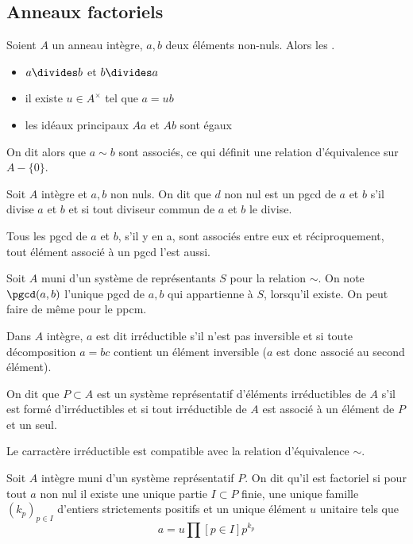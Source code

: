 \documentclass[a4paper,11pt,twocolumn]{article}
\begin{document}

  \subsection{Anneaux factoriels}

     Soient $A$ un anneau intègre, $a,b$ deux éléments non-nuls. Alors les \Asse{}.
    \begin{itemize}
      \item $a\divides b$ et $b\divides a$
      \item il existe $u\in A^\times$ tel que $a=ub$
      \item les idéaux principaux $Aa$ et $Ab$ sont égaux
    \end{itemize}

    On dit alors que $a\sim b$ sont associés, ce qui définit une relation d'équivalence sur $A-\{0\}$.

     Soit $A$ intègre et $a,b$ non nuls. On dit que $d$ non nul est un pgcd de $a$ et $b$ s'il divise $a$ et $b$ et si tout diviseur commun de $a$ et $b$ le divise.

     Tous les pgcd de $a$ et $b$, s'il y en a, sont associés entre eux et réciproquement, tout élément associé à un pgcd l'est aussi.

     Soit $A$ muni d'un système de représentants $S$ pour la relation $\sim$. On note $\pgcd(a,b)$ l'unique pgcd de $a,b$ qui appartienne à $S$, lorsqu'il existe. On peut faire de même pour le ppcm.

     Dans $A$ intègre, $a$ est dit irréductible s'il n'est pas inversible et si toute décomposition $a=bc$ contient un élément inversible ($a$ est donc associé au second élément).

     On dit que $P\subset A$ est un système représentatif d'éléments irréductibles de $A$ s'il est formé d'irréductibles et si tout irréductible de $A$ est associé à un élément de $P$ et un seul.

     Le carractère irréductible est compatible avec la relation d'équivalence $\sim$.

     Soit $A$ intègre muni d'un système représentatif $P$. On dit qu'il est factoriel si pour tout $a$ non nul il existe une unique partie $I\subset P$ finie, une unique famille $(k_p)_{p\in I}$ d'entiers strictements positifs et un unique élément $u$ unitaire tels que
    \[a = u\prod[p\in I]{p^{k_p}}\]
\end{document}
